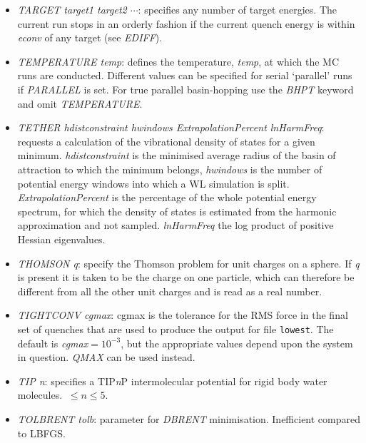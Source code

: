 \documentclass[12pt,a4paper,dvips]{article}
\begin{document}
\begin{itemize}
\item {\it TARGET target1 target2 $\cdots$\/}: specifies any number of target energies. 
The current run stops in an orderly
fashion if the current quench energy is within {\it econv\/} of any target (see {\it EDIFF\/}).

\item {\it TEMPERATURE temp\/}: defines the temperature, {\it temp\/}, at which the 
MC runs are conducted. Different values can be specified for serial `parallel' runs if
{\it PARALLEL} is set.
For true parallel basin-hopping use the {\it BHPT\/} keyword and omit {\it TEMPERATURE\/}.

\item {\it TETHER hdistconstraint hwindows ExtrapolationPercent lnHarmFreq}: requests a calculation of the vibrational density of
states for a given minimum. {\it hdistconstraint} is the minimised average radius of the basin of attraction to which the minimum
belongs, {\it hwindows} is the number of potential energy windows into which a WL simulation is split. {\it 
ExtrapolationPercent} is the percentage of the whole potential energy spectrum, for which the density of states is estimated from
the harmonic approximation and not sampled. {\it lnHarmFreq} the log product of positive Hessian
eigenvalues.

\item{\it THOMSON q\/}: specify the Thomson problem for unit charges on a sphere.
If {\it q\/} is present it is taken to be the charge on one particle, which can
therefore be different from all the other unit charges and is read as a real number.


\item {\it TIGHTCONV cgmax\/}: cgmax is the tolerance for the
RMS force in the final set of quenches that are used to produce
the output for file {\tt lowest}. The default is
{\it cgmax\/}$=10^{-3}$, but the appropriate values depend upon the system in question.
{\it QMAX} can be used instead.

\item {\it TIP n\/}: specifies a TIP{\it n\/}P intermolecular potential for rigid body water molecules.
$\ \le n \le 5$.

\item {\it TOLBRENT tolb\/}: parameter for {\it DBRENT\/} minimisation. 
Inefficient compared to LBFGS.


\end{itemize}
\end{document}
